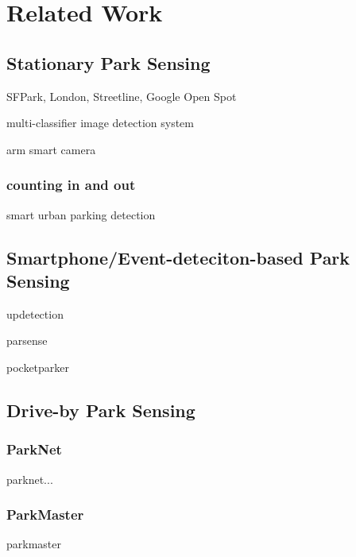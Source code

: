 \chapter{Related Work}
\label{chap:relatedwork}

\section{Stationary Park Sensing}

SFPark, London, Streetline, Google Open Spot

multi-classifier image detection system\cite{stationary_camera_sensing}

arm smart camera \cite{stationary_camera_sensing_arm_smart_camera}

\subsection{counting in and out}
smart urban parking detection \cite{smarturbanparkingdetection}

\section{Smartphone/Event-deteciton-based Park Sensing}


updetection\cite{Ma:2014:USP:2674918.2674929}

parsense \cite{Nawaz:2013:PSB:2500423.2500438}

pocketparker \cite{Nandugudi:2014:PPP:2632048.2632098}


\section{Drive-by Park Sensing}

\subsection{ParkNet}
\label{sec:parknet}

parknet... \cite{Mathur:2010:PDS:1814433.1814448}

\subsection{ParkMaster}
 
parkmaster \cite{Grassi:2017:PIE:3132211.3134452}

